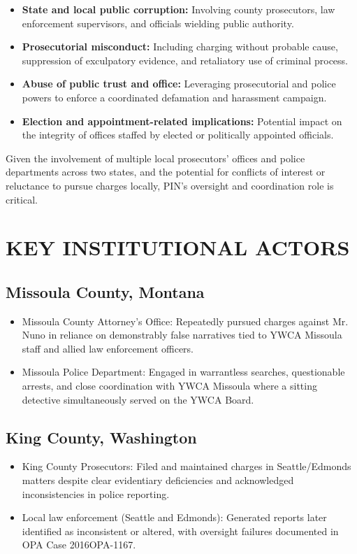 \documentclass[12pt,oneside]{article}
\begin{document}
\begin{flushleft}
\begin{itemize}
\item \textbf{State and local public corruption:} Involving county prosecutors, law enforcement supervisors, and officials wielding public authority.
\item \textbf{Prosecutorial misconduct:} Including charging without probable cause, suppression of exculpatory evidence, and retaliatory use of criminal process.
\item \textbf{Abuse of public trust and office:} Leveraging prosecutorial and police powers to enforce a coordinated defamation and harassment campaign.
\item \textbf{Election and appointment-related implications:} Potential impact on the integrity of offices staffed by elected or politically appointed officials.
\end{itemize}

Given the involvement of multiple local prosecutors' offices and police departments across two states, and the potential for conflicts of interest or reluctance to pursue charges locally, PIN's oversight and coordination role is critical.

\section*{KEY INSTITUTIONAL ACTORS}

\subsection*{Missoula County, Montana}

\begin{itemize}
\item Missoula County Attorney's Office: Repeatedly pursued charges against Mr. Nuno in reliance on demonstrably false narratives tied to YWCA Missoula staff and allied law enforcement officers.
\item Missoula Police Department: Engaged in warrantless searches, questionable arrests, and close coordination with YWCA Missoula where a sitting detective simultaneously served on the YWCA Board.
\end{itemize}

\subsection*{King County, Washington}

\begin{itemize}
\item King County Prosecutors: Filed and maintained charges in Seattle/Edmonds matters despite clear evidentiary deficiencies and acknowledged inconsistencies in police reporting.
\item Local law enforcement (Seattle and Edmonds): Generated reports later identified as inconsistent or altered, with oversight failures documented in OPA Case 2016OPA-1167.
\end{itemize}


\end{flushleft}
\end{document}
